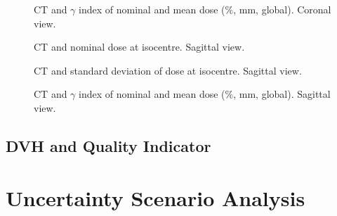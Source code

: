 \documentclass[a4paper]{scrartcl}
\begin{document}
\begin{figure}[!b]
  \centering
  
  \caption{CT and $\gamma$ index of nominal and mean dose (\gammaDoseAgreement \%, \gammaDoseAgreement mm, global). Coronal view.}
\end{figure}

\begin{figure}[!b]
  \centering
  
  \caption{CT and nominal dose at isocentre. Sagittal view.}
\end{figure}

\begin{figure}[!b]
  \centering
  
  \caption{CT and standard deviation of dose at isocentre. Sagittal view.}
\end{figure}

\begin{figure}[!b]
  \centering
  
  \caption{CT and $\gamma$ index of nominal and mean dose (\gammaDoseAgreement \%, \gammaDoseAgreement mm, global). Sagittal view.}
\end{figure}


\FloatBarrier

\newpage
\subsection{DVH and Quality Indicator}
\begin{center}

\end{center}


\FloatBarrier
\newpage
\section{Uncertainty Scenario Analysis}
\label{sec:usa}


\end{document}
